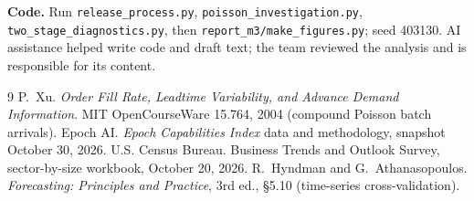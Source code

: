\documentclass[10pt]{article}
\begin{document}
{\footnotesize
\textbf{Code.} Run \texttt{release\_process.py}, \texttt{poisson\_investigation.py}, \texttt{two\_stage\_diagnostics.py}, then \texttt{report\_m3/make\_figures.py}; seed 403130. AI assistance helped write code and draft text; the team reviewed the analysis and is responsible for its content.
\begin{thebibliography}{9}\setlength{\itemsep}{0pt}
 P.~Xu. \emph{Order Fill Rate, Leadtime Variability, and Advance Demand Information}. MIT OpenCourseWare 15.764, 2004 (compound Poisson batch arrivals).
 Epoch AI. \emph{Epoch Capabilities Index} data and methodology, snapshot October 30, 2026.
 U.S. Census Bureau. Business Trends and Outlook Survey, sector-by-size workbook, October 20, 2026.
 R.~Hyndman and G.~Athanasopoulos. \emph{Forecasting: Principles and Practice}, 3rd ed., \S5.10 (time-series cross-validation).
\end{thebibliography}}
\end{document}
